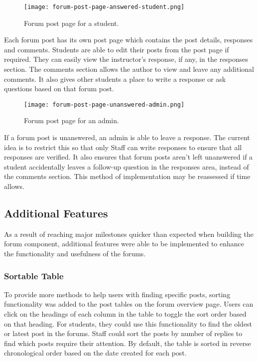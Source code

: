 \begin{figure}[h!]
    \texttt{[image: forum-post-page-answered-student.png]}
    \centering
    \caption{Forum post page for a student.}
\end{figure}

Each forum post has its own post page which contains the post details, responses and comments.
Students are able to edit their posts from the post page if required.
They can easily view the instructor's response, if any, in the responses section.
The comments section allows the author to view and leave any additional comments.
It also gives other students a place to write a response or ask questions based on that forum post.

\begin{figure}[h!]
    \texttt{[image: forum-post-page-unanswered-admin.png]}
    \centering
    \caption{Forum post page for an admin.}
\end{figure}

If a forum post is unanswered, an admin is able to leave a response.
The current idea is to restrict this so that only Staff can write responses to ensure that all responses are verified.
It also ensures that forum posts aren't left unanswered if a student accidentally leaves a follow-up question in the responses area, instead of the comments section.
This method of implementation may be reassessed if time allows.

\subsection{Additional Features}
As a result of reaching major milestones quicker than expected when building the forum component, additional features were able to be implemented to enhance the functionality and usefulness of the forums.

\subsubsection{Sortable Table}
To provide more methods to help users with finding specific posts, sorting functionality was added to the post tables on the forum overview page.
Users can click on the headings of each column in the table to toggle the sort order based on that heading.
For students, they could use this functionality to find the oldest or latest post in the forums.
Staff could sort the posts by number of replies to find which posts require their attention.
By default, the table is sorted in reverse chronological order based on the date created for each post.

